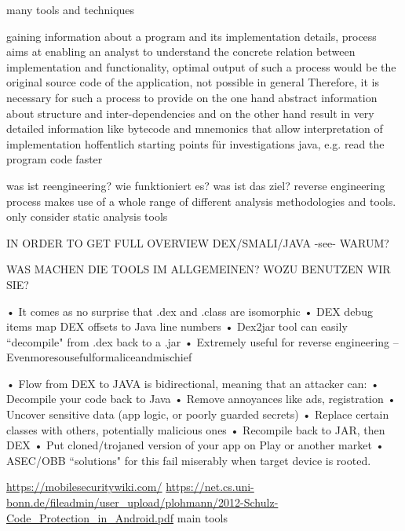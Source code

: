 many tools and techniques

gaining information about a program and its implementation
details, process aims at enabling an analyst to understand the concrete
relation between implementation and functionality, optimal output
of such a process would be the original source code of the application, not possible in general\newline
Therefore, it is necessary for such a process to provide on the one hand abstract information about structure and inter-dependencies and on the other hand result in very detailed information like bytecode and mnemonics that allow interpretation of implementation\newline
hoffentlich starting points für investigations\newline
java, e.g. read the program code faster\newline


was ist reengineering? wie funktioniert es? was ist das ziel?\newline
reverse engineering process makes use of a whole range of different analysis
methodologies and tools.\newline
only consider static analysis tools\newline

IN ORDER TO GET FULL OVERVIEW DEX/SMALI/JAVA -see- WARUM?\newline

WAS MACHEN DIE TOOLS IM ALLGEMEINEN? WOZU BENUTZEN WIR SIE?\newline

• It comes as no surprise that .dex and .class are isomorphic
• DEX debug items map DEX offsets to Java line numbers
• Dex2jar tool can easily “decompile" from .dex back to a .jar
•  Extremely useful for reverse engineering – Evenmoresousefulformaliceandmischief

• Flow from DEX to JAVA is bidirectional, meaning that an attacker can:
• Decompile your code back to Java
• Remove annoyances like ads, registration
• Uncover sensitive data (app logic, or poorly guarded secrets)
• Replace certain classes with others, potentially malicious ones
• Recompile back to JAR, then DEX
• Put cloned/trojaned version of your app on Play or another market
• ASEC/OBB “solutions" for this fail miserably when target device is rooted.


\url{https://mobilesecuritywiki.com/}\newline
\url{https://net.cs.uni-bonn.de/fileadmin/user_upload/plohmann/2012-Schulz-Code_Protection_in_Android.pdf}\newline
main tools\newline
